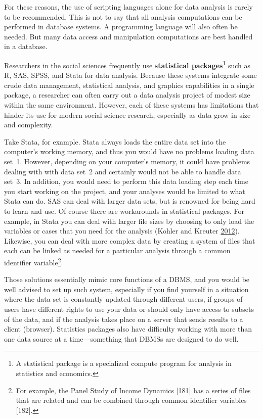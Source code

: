 \documentclass[]{krantz}
\begin{document}
For these reasons, the use of scripting languages alone for data
analysis is rarely to be recommended. This is not to say that all
analysis computations can be performed in database systems. A
programming language will also often be needed. But many data access and
manipulation computations are best handled in a database.

Researchers in the social sciences frequently use \textbf{statistical
packages}\footnote{A statistical package is a specialized compute
  program for analysis in statistics and economics.} such as R, SAS,
SPSS, and Stata for data analysis. Because these systems integrate some
crude data management, statistical analysis, and graphics capabilities
in a single package, a researcher can often carry out a data analysis
project of modest size within the same environment. However, each of
these systems has limitations that hinder its use for modern social
science research, especially as data grow in size and complexity.

Take Stata, for example. Stata always loads the entire data set into the
computer's working memory, and thus you would have no problems loading
data set~1. However, depending on your computer's memory, it could have
problems dealing with with data set~2 and certainly would not be able to
handle data set~3. In addition, you would need to perform this data
loading step each time you start working on the project, and your
analyses would be limited to what Stata can do. SAS can deal with larger
data sets, but is renowned for being hard to learn and use. Of course
there are workarounds in statistical packages. For example, in Stata you
can deal with larger file sizes by choosing to only load the variables
or cases that you need for the analysis (Kohler and Kreuter
\protect\hyperlink{ref-kohler2012datenanalyse}{2012}). Likewise, you can
deal with more complex data by creating a system of files that each can
be linked as needed for a particular analysis through a common
identifier variable\footnote{For example, the Panel Study of Income
  Dynamics {[}181{]} has a series of files that are related and can be
  combined through common identifier variables {[}182{]}.}.

Those solutions essentially mimic core functions of a DBMS, and you
would be well advised to set up such system, especially if you find
yourself in a situation where the data set is constantly updated through
different users, if groups of users have different rights to use your
data or should only have access to subsets of the data, and if the
analysis takes place on a server that sends results to a client
(browser). Statistics packages also have difficulty working with more
than one data source at a time---something that DBMSs are designed to do
well.
\end{document}
